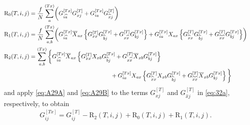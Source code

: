 \documentclass[10pt,a4paper]{amsart}
\numberwithin{equation}{section}
\newcommand*\barr[1]{\overline{#1}}
\newcommand*\bset[1]{[#1]}
\newcommand*\ubarr[1]{{\widehat{#1}}}
\begin{document}
	\begin{align}
		\mathrm{R}_0(T,i,j) & = \frac{f}{N} \sum_{a}^{(Tx)}  \biggl( G_{i \ubarr{a}}^{\bset{Tx}} G^{\bset{T}}_{xj} + G_{ia}^{\bset{Tx}} G_{\ubarr{x}j}^{\bset{T}} \biggr) \label{eq:defireste}\\
		\mathrm{R}_1(T,i,j)& = \frac{f}{N} \sum_{a,b}^{(Tx)} \biggl(G_{i\ubarr{a}}^{\bset{Tx}} \barr{X}_{ax} \left\{ G_{xx}^{\bset{T}}G_{\ubarr{b}j}^{\bset{Tx}} + G_{x\ubarr{x}}^{\bset{T}} G_{bj}^{\bset{Tx}} \right\} + G_{ia}^{\bset{Tx}} X_{ax} \left\{ G_{\ubarr{x}x}^{\bset{T}} G_{\ubarr{b}j}^{\bset{Tx}} + G_{\ubarr{x}\ubarr{x}}^{\bset{T}}  G_{bj}^{\bset{Tx}} \right\}\biggr) 
		\label{eq:def_R_1}\\ 
		\mathrm{R}_2(T,i,j) & = \sum_{a,b}^{(Tx)} \bigg\{G_{i\ubarr{a}}^{\bset{Tx}} \barr{X}_{ax} \left\{ G_{xx}^{\bset{T}} X_{xb} G_{\ubarr{b}j}^{\bset{Tx}} + G_{x\ubarr{x}}^{\bset{T}} \barr{X}_{xb}G_{bj}^{\bset{Tx}} \right\} 
		\notag \\ 
		& \qquad \qquad \qquad \qquad \qquad \qquad \qquad  +  G_{ia}^{\bset{Tx}} X_{ax} \left\{ G_{\ubarr{x}x}^{\bset{T}} X_{xb} G_{\ubarr{b}j}^{\bset{Tx}} + G_{\ubarr{x}\ubarr{x}}^{\bset{T}} \barr{X}_{xb} G_{bj}^{\bset{Tx}} \right\} \bigg\}\label{eq:def_R_2} 
	\end{align}
	and apply \cref{eq:A29A} and \cref{eq:A29B} to the terms $G_{xj}^{\bset{T}}$ and $G_{\ubarr{x}j}^{\bset{T}}$ in \cref{eq:32a}, respectively, to obtain 
	\begin{align}
		G_{ij}^{\bset{Tx}} = G_{ij}^{\bset{T}} - \mathrm{R}_2(T,i,j)
		+ \mathrm{R}_0(T,i,j)+ \mathrm{R}_1(T,i,j). \label{eq:A32b}
	\end{align}
\end{document}
